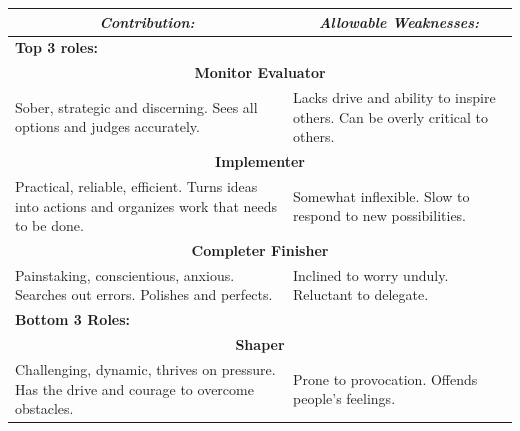 \begin{table}[ht]
\centering
\begin{tabular}{|p{}|p{}|}
\hline
\multicolumn{1}{|c|}{\textit{Contribution:}}                                                  & \multicolumn{1}{c|}{\textit{Allowable Weaknesses:}}                          \\ \hline
\multicolumn{2}{|l|}{\textbf{Top 3 roles:}}                                                                                                                                  \\ \hline
\multicolumn{2}{|c|}{\textbf{Monitor Evaluator}}                                                                                                                             \\ \hline
Sober, strategic and discerning. Sees all options and judges accurately.                      & Lacks drive and ability to inspire others. Can be overly critical to others. \\ \hline
\multicolumn{2}{|c|}{\textbf{Implementer}}                                                                                                                                   \\ \hline
Practical, reliable, efficient. Turns ideas into actions and organizes work that needs to be done.& Somewhat inflexible. Slow to respond to new possibilities.                  \\ \hline
\multicolumn{2}{|c|}{\textbf{Completer Finisher}}                                                                                                                            \\ \hline
Painstaking, conscientious, anxious. Searches out errors. Polishes and perfects.              & Inclined to worry unduly. Reluctant to delegate.                             \\ \hline
\multicolumn{2}{|l|}{\textbf{Bottom 3 Roles:}}                                                                                                                                \\ \hline
\multicolumn{2}{|c|}{\textbf{Shaper}}                                                                                                                                        \\ \hline
Challenging, dynamic, thrives on pressure. Has the drive and courage to overcome obstacles. & Prone to provocation. Offends people's feelings.                             \\ \hline

\end{tabular}
\end{table}
